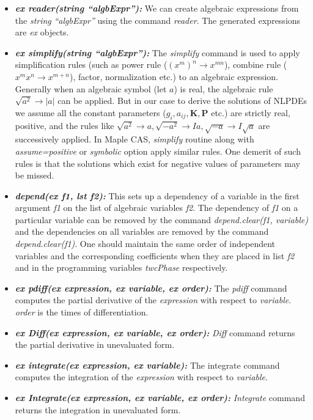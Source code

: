 \documentclass[prd,aps,floats,showkeys,nofootinbib,notitlepage]{revtex4-2}
\begin{document}
\begin{itemize}
		\item[] {\em \textbf{ex reader(string ``algbExpr''):}} We can create algebraic expressions from the {\em string} {\em ``algbExpr''} using the command {\em reader}. The generated expressions are {\em ex } objects.
		\item[] {\em \textbf{ex simplify(string ``algbExpr''):}} The {\em simplify} command is used to apply simplification rules (such as power rule ($(x^m)^n\rightarrow x^{mn}$), combine rule ($x^mx^n\rightarrow x^{m+n}$), factor, normalization etc.) to an algebraic expression. Generally when an algebraic symbol (let $a$) is real, the algebraic rule $\sqrt{a^2}\rightarrow |a|$ can be applied. But in our case to derive the solutions of NLPDEs we assume all the constant parameters ($g_i,a_{ij},\boldsymbol{K},\boldsymbol{P}$ etc.) are strictly real, positive, and the rules like $\sqrt{a^2}\rightarrow a,\sqrt{-a^2}\rightarrow Ia, \sqrt{-a}\rightarrow I\sqrt{a}$ are successively applied. In {Maple} CAS, {\em simplify} routine along with {\em assume=positive} or {\em symbolic} option apply similar rules. One demerit of such rules is that the solutions which exist for negative values of parameters may be missed. 
		
		\item[] {\em \textbf{depend(ex f1, lst f2):}} This sets up a dependency of a variable in the first argument {\em f1} on the list of algebraic variables {\em f2}. The dependency of {\em f1} on a particular variable can be removed by the command {\em depend.clear(f1, variable)} and the dependencies on all variables are removed by the command {\em depend.clear(f1)}.
		One should maintain the same order of independent variables and the corresponding coefficients when they are placed in list {\em f2} and in the programming variables {\em twcPhase} respectively. 
		\item[] {\em \textbf{ex pdiff(ex expression, ex variable, ex order):}} The {\em pdiff} command computes the partial derivative of the {\em expression} with respect to {\em variable}. {\em order} is the times of differentiation.
		\item[] {\em \textbf{ex Diff(ex expression, ex variable, ex order):}} {\em Diff} command returns the partial derivative in unevaluated form.
		\item[] {\em \textbf{ex integrate(ex expression, ex variable):}} The integrate command computes the integration of the {\em expression} with respect to {\em variable}. 
		
		\item[] {\em \textbf{ex Integrate(ex expression, ex variable, ex order):}} {\em Integrate} command returns the integration in unevaluated form.
		

\end{itemize}
\end{document}
